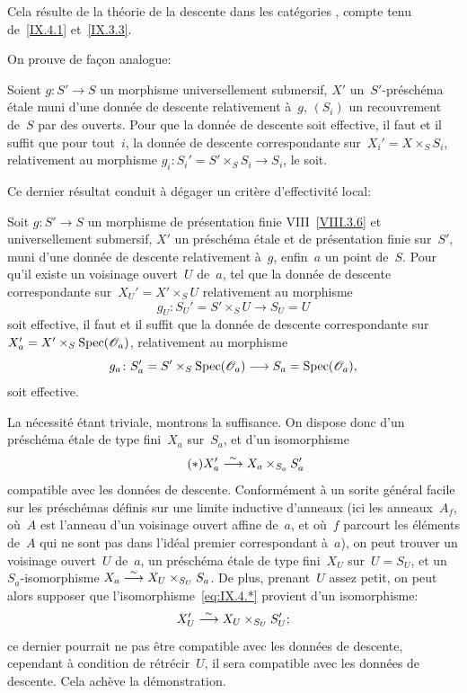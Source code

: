 Cela r\'esulte de la th\'eorie de la descente dans les
cat\'egories \cite{IX.D}, compte tenu de~\ref{IX.4.1} et~\ref{IX.3.3}.

On prouve de fa\c con analogue:

\begin{corollaire}
\label{IX.4.3}
Soient $g\colon S'\to S$ un morphisme universellement submersif, $X'$
un~$S'$-pr\'esch\'ema \'etale muni d'une donn\'ee de descente
relativement \`a~$g$, $(S_i)$ un recouvrement de~$S$ par des
ouverts. Pour que la donn\'ee de descente soit effective, il faut
et il suffit que pour tout~$i$, la donn\'ee de descente
correspondante sur~$X_i'=X\times_S S_i$, relativement au morphisme
$g_i\colon S_i'=S'\times_S S_i\to S_i$, le soit.
\end{corollaire}

Ce dernier r\'esultat conduit \`a d\'egager un crit\`ere
d'effectivit\'e local:

\enlargethispage{.3cm}
\begin{proposition}
\label{IX.4.4}
Soit $g\colon S'\to S$ un morphisme de pr\'esentation finie
\textup{VIII}~\ref{VIII.3.6}
et universellement submersif, $X'$ un pr\'esch\'ema \'etale et
de pr\'esentation finie sur~$S'$, muni d'une donn\'ee de descente
relativement \`a~$g$, enfin~$a$ un point de~$S$. Pour qu'il existe
un voisinage ouvert~$U$ de~$a$, tel que la donn\'ee de descente
correspondante sur~$X_U'=X'\times_S U$ relativement au morphisme
$$g_U\colon S_U'=S'\times_S U\to S_U=U$$ soit effective, il faut et il
suffit que la donn\'ee de descente correspondante sur $X_a'=X'\times_S\Spec(\cal{O}_a)$, relativement au morphisme
$$g_a\colon S_a'=S'\times_S\Spec(\cal{O}_a)\to S_a=\Spec(\cal{O}_a),$$
soit effective.
\end{proposition}

La n\'ecessit\'e \'etant triviale, montrons la suffisance. On
dispose donc d'un pr\'esch\'ema \'etale de type fini~$X_a$
sur~$S_a$, et d'un isomorphisme
\begin{equation*}
\label{eq:IX.4.*}
\tag{$*$} {X_a'\overset{\sim}{\longrightarrow}X_a\times_{S_a}S_a'}
\end{equation*}
compatible avec les donn\'ees de descente. Conform\'ement \`a
un sorite g\'en\'eral facile sur les pr\'esch\'emas
d\'efinis sur une limite inductive d'anneaux (ici les anneaux~$A_f$,
o\`u~$A$ est l'anneau d'un voisinage ouvert affine de~$a$, et
o\`u~$f$ parcourt les \'el\'ements de~$A$ qui ne sont pas dans
l'id\'eal premier correspondant \`a~$a$), on peut trouver un
voisinage ouvert~$U$ de~$a$, un pr\'esch\'ema \'etale de type
fini~$X_U$ sur~$U=S_U$, et un $S_a$-isomorphisme $X_a\overset{\sim}{\longrightarrow}
X_U\times_{S_U}S_a$. De plus, prenant~$U$ assez petit, on peut alors
supposer que l'isomorphisme~\eqref{eq:IX.4.*} provient d'un
isomorphisme:
$$
X_U'\overset{\sim}{\longrightarrow} X_U\times_{S_U} S_U';
$$
ce dernier pourrait ne pas \^etre compatible avec les donn\'ees de
descente, cependant \`a condition de r\'etr\'ecir~$U$, il sera
compatible avec les donn\'ees de descente. Cela ach\`eve la
d\'emonstration.

